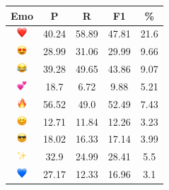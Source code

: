 \documentclass{article}
\begin{document}
\begin{table}
\centering
\begin{tabular}{|c|ccc|c|} \hline
\textbf{Emo} & \textbf{P} & \textbf{R} & \textbf{F1} & \textbf{\%} \\ \hline
\includegraphics[height=0.37cm,width=0.37cm]{img/red_heart.png} & 40.24 & 58.89 & 47.81 & 21.6\\ 
\includegraphics[height=0.37cm,width=0.37cm]{img/smiling_face_with_hearteyes.png} & 28.99 & 31.06 & 29.99 & 9.66\\ 
\includegraphics[height=0.37cm,width=0.37cm]{img/face_with_tears_of_joy.png} & 39.28 & 49.65 & 43.86 & 9.07\\ 
\includegraphics[height=0.37cm,width=0.37cm]{img/two_hearts.png} & 18.7 & 6.72 & 9.88 & 5.21\\ 
\includegraphics[height=0.37cm,width=0.37cm]{img/fire.png} & 56.52 & 49.0 & 52.49 & 7.43\\ 
\includegraphics[height=0.37cm,width=0.37cm]{img/smiling_face_with_smiling_eyes.png} & 12.71 & 11.84 & 12.26 & 3.23\\ 
\includegraphics[height=0.37cm,width=0.37cm]{img/smiling_face_with_sunglasses.png} & 18.02 & 16.33 & 17.14 & 3.99\\ 
\includegraphics[height=0.37cm,width=0.37cm]{img/sparkles.png} & 32.9 & 24.99 & 28.41 & 5.5\\ 
\includegraphics[height=0.37cm,width=0.37cm]{img/blue_heart.png} & 27.17 & 12.33 & 16.96 & 3.1\\ 

\end{tabular}
\end{table}
\end{document}
